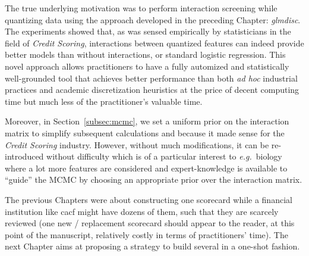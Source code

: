 The true underlying motivation was to perform interaction screening while quantizing data using the approach developed in the preceding Chapter: \textit{glmdisc}.
The experiments showed that, as was sensed empirically by statisticians in the field of \textit{Credit Scoring}, interactions between quantized features can indeed provide better models than without interactions, or standard logistic regression. This novel approach allows practitioners to have a fully automized and statistically well-grounded tool that achieves better performance than both \textit{ad hoc} industrial practices and academic discretization heuristics at the price of decent computing time but much less of the practitioner's valuable time.

Moreover, in Section~\ref{subsec:mcmc}, we set a uniform prior on the interaction matrix to simplify subsequent calculations and because it made sense for the \textit{Credit Scoring} industry. However, without much modifications, it can be re-introduced without difficulty which is of a particular interest to \textit{e.g.}\ biology where a lot more features are considered and expert-knowledge is available to ``guide'' the MCMC by choosing an appropriate prior over the interaction matrix.

\bigskip

The previous Chapters were about constructing one scorecard while a financial institution like \gls{cacf} might have dozens of them, such that they are scarcely reviewed (one new / replacement scorecard should appear to the reader, at this point of the manuscript, relatively costly in terms of practitioners' time). The next Chapter aims at proposing a strategy to build several in a one-shot fashion.



\printbibliography[heading=subbibliography, title=References of Chapter 4]
